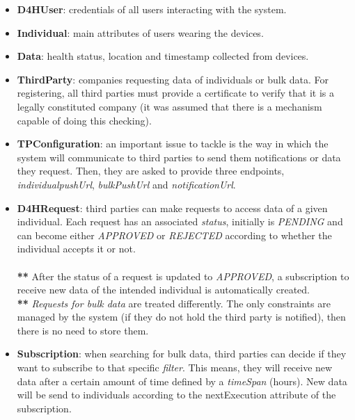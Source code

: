 \documentclass[a4paper, hidelinks, 12pt]{report}
\begin{document}
	\begin{itemize}
		\item{\textbf{D4HUser}}: credentials of all users interacting with the system.
		\item{\textbf{Individual}}: main attributes of users wearing the devices.
		\item{\textbf{Data}}: health status, location and timestamp collected from devices.
		\item{\textbf{ThirdParty}}: companies requesting data of individuals or bulk data. For registering, all third parties must provide a certificate to verify that it is a legally constituted company (it was assumed that there is a mechanism capable of doing this checking).
		
		\item{\textbf{TPConfiguration}}: an important issue to tackle is the way in which the system will communicate to third parties to send them notifications or data they request. Then, they are asked to provide three endpoints,
	 \textit{individualpushUrl}, \textit{bulkPushUrl} and \textit{notificationUrl}.
	 
		\item{\textbf{D4HRequest}}: third parties can make requests to access data of a given individual. Each request has an associated \textit{status}, initially is \textit{PENDING} and can become either \textit{APPROVED} or \textit{REJECTED} according to whether the individual accepts it or not. \\\\
		\textbf{**} After the status of a request is updated to \textit{APPROVED}, a subscription to receive new data of the intended individual is automatically created. \\
		\textbf{**} \textit{Requests for bulk data} are treated differently. The only constraints are managed by the system (if they do not hold the third party is notified), then there is no need to store them.
		
		\item{\textbf{Subscription}}: when searching for bulk data, third parties can decide if they want to subscribe to that specific \textit{filter}. This means, they will receive new data after a certain amount of time defined by a \textit{timeSpan} (hours). New data will be send to individuals according to the nextExecution attribute of the subscription.
	\end{itemize}
\end{document}

